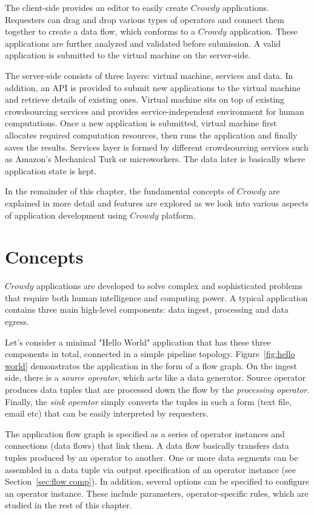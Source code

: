 The client-side provides an editor to easily create $Crowdy$ applications. Requesters 
can drag and drop various types of operators and connect them together to create a data 
flow, which conforms to a $Crowdy$ application. These applications are further analyzed 
and validated before submission. A valid application is submitted to the virtual machine 
on the server-side.

The server-side consists of three layers: virtual machine, services and data. In addition, 
an API is provided to submit new applications to the virtual machine and retrieve details 
of existing ones. Virtual machine sits on top of existing crowdsourcing services and 
provides service-independent environment for human computations. Once a new 
application is submitted, virtual machine first allocates required computation resources, 
then runs the application and finally saves the results. Services layer is formed by 
different crowdsourcing services such as Amazon's Mechanical Turk or microworkers. 
The data later is basically where application state is kept.

In the remainder of this chapter, the fundamental concepts of $Crowdy$ are explained 
in more detail and features are explored as we look into various aspects of application 
development using $Crowdy$ platform.

\section{Concepts}

$Crowdy$ applications are developed to solve complex and sophisticated problems 
that require both human intelligence and computing power. A typical application contains 
three main high-level components: data ingest, processing and data egress.

Let's consider a minimal "Hello World" application that has these three components 
in total, connected in a simple pipeline topology. Figure~\ref{fig:hello world} demonstrates 
the application in the form of a flow graph. On the ingest side, there is a 
\textit{source operator}, which acts like a data generator. Source operator produces 
data tuples that are processed down the flow by the 
\textit{processing operator}. Finally, the \textit{sink operator} simply converts the tuples 
in such a form (text file, email etc) that can be easily interpreted by requesters.

The application flow graph is specified as a series of operator instances and connections 
(data flows) that link them. A data flow basically transfers data tuples 
produced by an operator to another. One or more data segments can be assembled in a 
data tuple via output specification of an operator instance (see Section~\ref{sec:flow comp}). 
In addition, several options can be specified to configure an operator instance. These 
include parameters, operator-specific rules, which are studied in the rest of this chapter.

